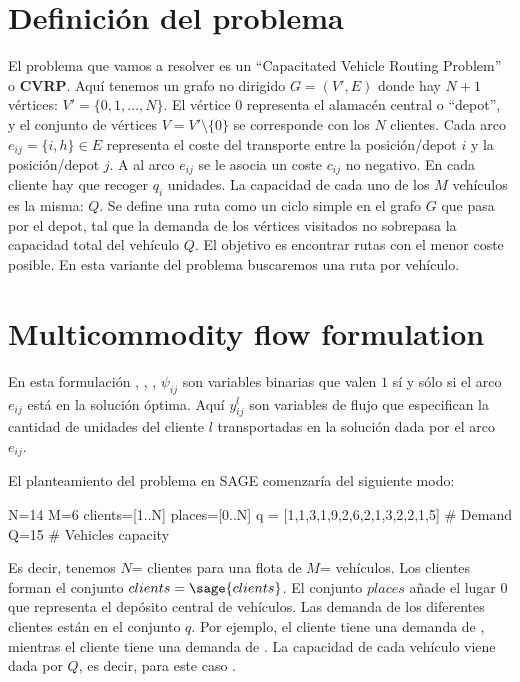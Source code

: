 \documentclass{article}
\begin{document}


\section{Definición del problema}

El problema que vamos a resolver es un ``Capacitated Vehicle Routing Problem'' o \textbf{CVRP}. Aquí tenemos un grafo no dirigido $G=(V',E)$ donde hay $N+1$ vértices: $V'=\{0,1,\dots, N\}$. El vértice $0$ representa el alamacén central o ``depot'', y el conjunto de vértices $V=V' \setminus \{ 0 \}$ se corresponde con los $N$ clientes. Cada arco $e_{ij}=\{i, h\} \in E$ representa el coste del transporte entre la posición/depot $i$ y la posición/depot $j$. A al arco $e_{ij}$ se le asocia un coste $c_{ij}$ no negativo. En cada cliente hay que recoger $q_i$ unidades. La capacidad de cada uno de los $M$ vehículos es la misma: $Q$. Se define una ruta como un ciclo simple en el grafo $G$ que pasa por el depot, tal que la demanda de los vértices visitados no sobrepasa la capacidad total del vehículo $Q$. El objetivo es encontrar rutas con el menor coste posible. En esta variante del problema buscaremos una ruta por vehículo. 

\section{Multicommodity flow formulation}

En esta formulación \cite{Garvin1957}, \cite{Garvin1979}, \cite{Garvin1982}, $\psi_{ij}$ son variables binarias que valen $1$ sí y sólo si el arco $e_{ij}$ está en la solución óptima. Aquí $y^l_{ij}$ son variables de flujo que especifican la cantidad de unidades del cliente $l$ transportadas en la solución dada por el arco $e_{ij}$.



El planteamiento del problema en SAGE comenzaría del siguiente modo:

\begin{sageblock}
N=14
M=6
clients=[1..N]
places=[0..N]
q = [1,1,3,1,9,2,6,2,1,3,2,2,1,5] # Demand
Q=15 # Vehicles capacity
\end{sageblock}

Es decir, tenemos $N$= clientes para una flota de $M$= vehículos. Los clientes forman el conjunto $clients= \sage{clients}$. El conjunto $places$ añade el lugar $0$ que representa el depósito central de vehículos. Las demanda de los diferentes clientes están en el conjunto $q$. Por ejemplo, el cliente  tiene una demanda de , mientras el cliente  tiene una demanda de . La capacidad de cada vehículo viene dada por $Q$, es decir, para este caso .
\end{document}
